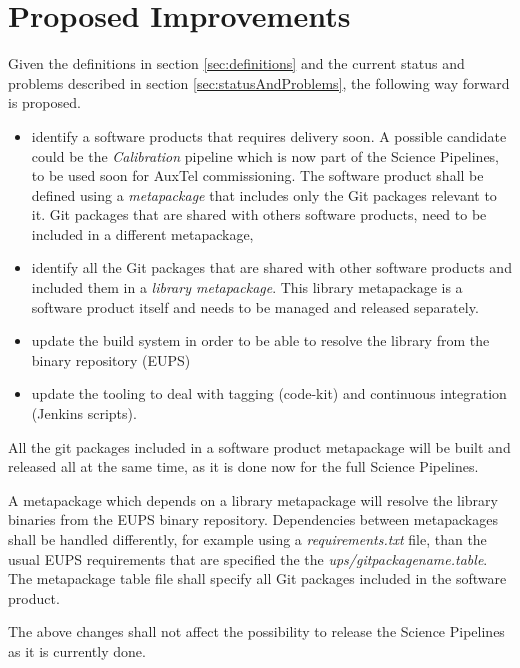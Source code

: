 \newpage
\section{Proposed Improvements}\label{sec:proimp}

Given the definitions in section \ref{sec:definitions} and the current status and problems described in section \ref{sec:statusAndProblems}, the following way forward is proposed.

\begin{itemize}
\item identify a software products that requires delivery soon.
A possible candidate could be the \textit{Calibration} pipeline which is now  part of the Science Pipelines, to be used soon for AuxTel commissioning.
The software product shall be defined using a \textit{metapackage} that includes only the Git packages relevant to it.
Git packages that are shared with others software products, need to be included in a different metapackage,
\item identify all the Git packages that are shared with other software products and included them in a \textit{library metapackage}.
This library metapackage is a software product itself and needs to be managed and released separately.
\item update the build system in order to be able to resolve the library from the binary repository (EUPS)
\item update the tooling to deal with tagging (code-kit) and continuous integration (Jenkins scripts).
\end{itemize}

All the git packages included in a software product metapackage will be built and released all at the same time, as it is done now for the full Science Pipelines.

A metapackage which depends on a library metapackage will resolve the library binaries from the EUPS binary repository.
Dependencies between metapackages shall be handled differently, for example using a \textit{requirements.txt} file, than the usual EUPS requirements that are specified the the \textit{ups/gitpackagename.table}.
The metapackage table file shall specify all Git packages included in the  software product.

The above changes shall not affect the possibility to release the Science Pipelines as it is currently done.

